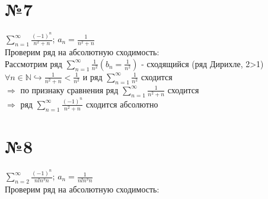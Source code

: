 \documentclass[a4paper,12pt]{article}
\begin{document}
\section*{№7}
	$\sum\limits_{n=1}^{\infty} \frac{(-1)^n}{n^2+n}$;
	$a_n = \frac{1}{n^2+n}$\\
	Проверим ряд на абсолютную сходимость:\\
	Рассмотрим ряд $\sum\limits_{n=1}^{\infty} \frac{1}{n^2} (b_n = \frac{1}{n^2})$
	- сходящийся (ряд Дирихле, 2>1)\\
	$\forall n \in \mathbb{N} \hookrightarrow \frac{1}{n^2+n} < \frac{1}{n^2}$ 
	и ряд $\sum\limits_{n=1}^{\infty} \frac{1}{n^2}$ сходится\\
	$\Rightarrow$ по признаку сравнения ряд 
	$\sum\limits_{n=1}^{\infty} \frac{1}{n^2+n}$ сходится\\
	$\Rightarrow$ ряд $\sum\limits_{n=1}^{\infty} \frac{(-1)^n}{n^2+n}$ сходится абсолютно
	
\section*{№8}
	$\sum\limits_{n=2}^{\infty} \frac{(-1)^n}{nln^3n}$;
	$a_n = \frac{1}{nln^3n}$\\
	Проверим ряд на абсолютную сходимость:\\
	
	
	
	
	
	

	
	
	
	
	
	
	
	
	
	
	
	
	
	
	
	
\end{document}
